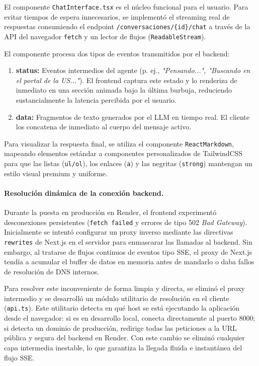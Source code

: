 \documentclass[12pt,a4paper,oneside]{report}
\begin{document}
El componente \texttt{ChatInterface.tsx} es el núcleo funcional para el usuario. Para evitar tiempos de espera innecesarios, se implementó el streaming real de respuestas consumiendo el endpoint \texttt{/conversaciones/\{id\}/chat} a través de la API del navegador \texttt{fetch} y un lector de flujos (\texttt{ReadableStream}).

El componente procesa dos tipos de eventos transmitidos por el backend:
\begin{enumerate}
    \item \textbf{status:} Eventos intermedios del agente (p. ej., \textit{"Pensando...", "Buscando en el portal de la US..."}). El frontend captura este estado y lo renderiza de inmediato en una sección animada bajo la última burbuja, reduciendo sustancialmente la latencia percibida por el usuario.
    \item \textbf{data:} Fragmentos de texto generados por el LLM en tiempo real. El cliente los concatena de inmediato al cuerpo del mensaje activo.
\end{enumerate}

Para visualizar la respuesta final, se utiliza el componente \texttt{ReactMarkdown}, mapeando elementos estándar a componentes personalizados de TailwindCSS para que las listas (\texttt{ul/ol}), los enlaces (\texttt{a}) y las negritas (\texttt{strong}) mantengan un estilo visual premium y uniforme.

\paragraph{Resolución dinámica de la conexión backend.} Durante la puesta en producción en Render, el frontend experimentó desconexiones persistentes (\texttt{fetch failed} y errores de tipo 502 \textit{Bad Gateway}). Inicialmente se intentó configurar un proxy inverso mediante las directivas \texttt{rewrites} de Next.js en el servidor para enmascarar las llamadas al backend. Sin embargo, al tratarse de flujos continuos de eventos tipo SSE, el proxy de Next.js tendía a acumular el buffer de datos en memoria antes de mandarlo o daba fallos de resolución de DNS internos. 

Para resolver este inconveniente de forma limpia y directa, se eliminó el proxy intermedio y se desarrolló un módulo utilitario de resolución en el cliente (\texttt{api.ts}). Este utilitario detecta en qué host se está ejecutando la aplicación desde el navegador: si es en desarrollo local, conecta directamente al puerto 8000; si detecta un dominio de producción, redirige todas las peticiones a la URL pública y segura del backend en Render. Con este cambio se eliminó cualquier capa intermedia inestable, lo que garantiza la llegada fluida e instantánea del flujo SSE.
\end{document}
